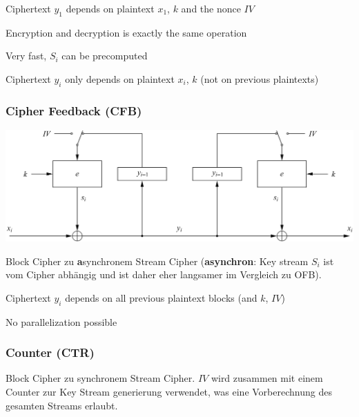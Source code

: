 \documentclass[
  10pt,
  a4paper,
]{article}
\begin{document}
\begin{multicols*}{2}
{\footnotesize\begin{description}[parsep=0mm,labelsep=2pt,labelwidth=8pt]
  \item[\color{OliveGreen}\faPlus] Ciphertext $y_1$ depends on plaintext $x_1$, $k$ and the nonce $IV$
  \item[\color{OliveGreen}\faPlus] Encryption and decryption is exactly the same operation
  \item[\color{OliveGreen}\faPlus] Very fast, $S_i$ can be precomputed
  \item[\color{BrickRed}\faMinus] Ciphertext $y_i$ only depends on plaintext $x_i$, $k$ (not on previous plaintexts)
\end{description}}

\subsubsection{Cipher Feedback (CFB)}\label{cipher-feedback-cfb}

\includegraphics{images/crypto/image-3.png}

Block Cipher zu \textbf{a}synchronem Stream Cipher (\textbf{asynchron}:
Key stream \(S_i\) ist vom Cipher abhängig und ist daher eher langsamer
im Vergleich zu OFB).

{\footnotesize\begin{description}[parsep=0mm,labelsep=2pt,labelwidth=8pt]
  \item[\color{OliveGreen}\faPlus] Ciphertext $y_i$ depends on all previous plaintext blocks (and $k$, $IV$)
  \item[\color{BrickRed}\faMinus] No parallelization possible
\end{description}}

\subsubsection{Counter (CTR)}\label{counter-ctr}

Block Cipher zu synchronem Stream Cipher. \(IV\) wird zusammen mit einem
Counter zur Key Stream generierung verwendet, was eine Vorberechnung des
gesamten Streams erlaubt.


\end{multicols*}
\end{document}
